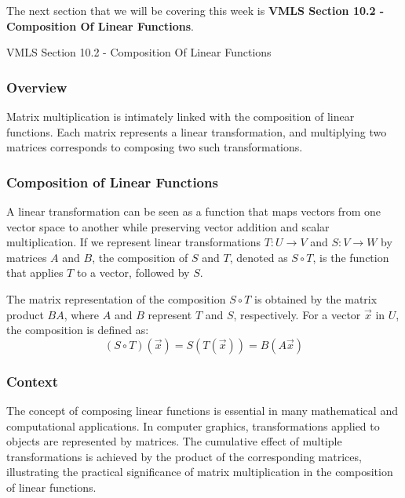 The next section that we will be covering this week is \textbf{VMLS Section 10.2 - Composition Of Linear Functions}.

\begin{notes}{VMLS Section 10.2 - Composition Of Linear Functions}
    \subsubsection*{Overview}

    Matrix multiplication is intimately linked with the composition of linear functions. Each matrix represents a linear transformation, and multiplying two matrices corresponds to composing two such 
    transformations. \vspace*{1em}

    \subsubsection*{Composition of Linear Functions}
    
    A linear transformation can be seen as a function that maps vectors from one vector space to another while preserving vector addition and scalar multiplication. If we represent linear transformations 
    $T: U \rightarrow V$ and $S: V \rightarrow W$ by matrices $A$ and $B$, the composition of $S$ and $T$, denoted as $S \circ T$, is the function that applies $T$ to a vector, followed by $S$. \vspace*{1em}

    \begin{highlight}
        The matrix representation of the composition $S \circ T$ is obtained by the matrix product $BA$, where $A$ and $B$ represent $T$ and $S$, respectively. For a vector $\vec{x}$ in $U$, the composition 
        is defined as:
        \begin{equation*}
            (S \circ T)(\vec{x}) = S(T(\vec{x})) = B(A\vec{x})
        \end{equation*}
    \end{highlight}
    
    \subsubsection*{Context}
    
    The concept of composing linear functions is essential in many mathematical and computational applications. In computer graphics, transformations applied to objects are represented by matrices. The 
    cumulative effect of multiple transformations is achieved by the product of the corresponding matrices, illustrating the practical significance of matrix multiplication in the composition of linear functions.
\end{notes}


